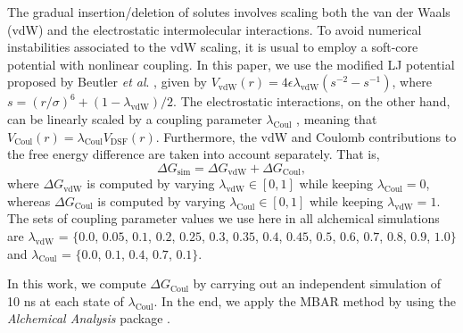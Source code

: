 \documentclass[3p,twocolumn]{elsarticle}
\begin{document}
The gradual insertion/deletion of solutes involves scaling both the van der Waals (vdW) and the electrostatic intermolecular interactions.
To avoid numerical instabilities associated to the vdW scaling, it is usual to employ a soft-core potential with nonlinear coupling.
In this paper, we use the modified LJ potential proposed by Beutler \textit{et al}. \cite{Beutler_1994}, given by $V_\text{vdW}(r) = 4 \epsilon \lambda_\text{vdW} (s^{-2} - s^{-1})$, where $s = (r/\sigma)^6 + (1 - \lambda_\text{vdW})/2$.
The electrostatic interactions, on the other hand, can be linearly scaled by a coupling parameter $\lambda_\text{Coul}$ \cite{Naden_2015}, meaning that $V_\text{Coul}(r) = \lambda_\text{Coul} V_\text{DSF}(r)$.
Furthermore, the vdW and Coulomb contributions to the free energy difference are taken into account separately.
That is,
\begin{equation}
\Delta G_\text{sim} = \Delta G_\text{vdW} + \Delta G_\text{Coul},
\end{equation}
where $\Delta G_\text{vdW}$ is computed by varying $\lambda_\text{vdW} \in [0,1]$ while keeping $\lambda_\text{Coul} = 0$, whereas $\Delta G_\text{Coul}$ is computed by varying $\lambda_\text{Coul} \in [0,1]$ while keeping $\lambda_\text{vdW} = 1$.
The sets of coupling parameter values we use here in all alchemical simulations are $\lambda_{\text{vdW}}$ = $\{0.0$, $0.05$, $0.1$, $0.2$, $0.25$, $0.3$, $0.35$, $0.4$, $0.45$, $0.5$, $0.6$, $0.7$, $0.8$, $0.9$, $1.0\}$ and $\lambda_{\text{Coul}}$ = $\{0.0$, $0.1$, $0.4$, $0.7$, $0.1\}$.

In this work, we compute $\Delta G_\text{Coul}$ by carrying out an independent simulation of 10 ns at each state of $\lambda_{\text{Coul}}$.
In the end, we apply the MBAR method \cite{Shirts_2008} by using the \textit{Alchemical Analysis} package \cite{Klimovich_2015}.
\end{document}
